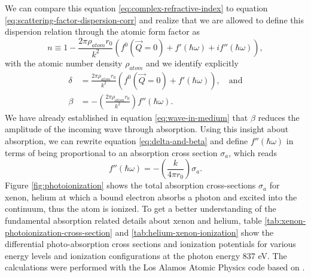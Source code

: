 We can compare this equation \eqref{eq:complex-refractive-index} to equation \eqref{eq:scattering-factor-dispersion-corr} and realize that we are allowed to define this dispersion relation through the atomic form factor as \citep[see][p.~76]{Als-Nielson-2011-JWS}
\begin{equation}
n\equiv 1- \frac{2\pi \rho_{atom}r_{0}}{k^{2}}\left(f^{0}\left(\vec{Q}=0\right)+f'\left(\hbar\omega\right)+i f''\left(\hbar\omega\right)\right),
\label{eq:eq:complex-refractive-index-atomic-factors}
\end{equation}
with the atomic number density $\rho_{atom}$ and we identify explicitly
\begin{align}
\delta &= \frac{2 \pi \rho_{atom} r_{0}}{k^{2}}\left(f^{0}\left(\vec{Q}=0\right)+f'\left(\hbar\omega\right)\right),\quad \text{and}\\
\beta &= - \left(\frac{2\pi \rho_{atom}r_{0}}{k^{2}}\right)f''\left(\hbar\omega\right).
\label{eq:delta-and-beta}
\end{align}
We have already established in equation \eqref{eq:wave-in-medium} that $\beta$ reduces the amplitude of the incoming wave through absorption. Using this insight about absorption, we can rewrite equation \eqref{eq:delta-and-beta} and define $f''\left(\hbar\omega\right)$ in terms of being proportional to an absorption cross section $\sigma_{a}$, which reads
\begin{equation}
f''\left(\hbar\omega\right)=-\left(\frac{k}{4\pi r_{0}}\right)\sigma_{a}.
\label{eq:f-2-definition}
\end{equation}
Figure \ref{fig:photoionization} shows the total absorption cross-sections $\sigma_{a}$ for xenon, helium at which a bound electron absorbs a photon and excited into the continuum, thus the atom is ionized. To get a better understanding of the fundamental absorption related details about xenon and helium, table \ref{tab:xenon-photoionization-cross-section} and \ref{tab:helium-xenon-ionization} show the differential photo-absorption cross sections and ionization potentials for various energy levels and ionization configurations at the photon energy $837$ eV. The calculations were performed with the Los Alamos Atomic Physics code based on \citep{Cowan-1981-Cal}.
